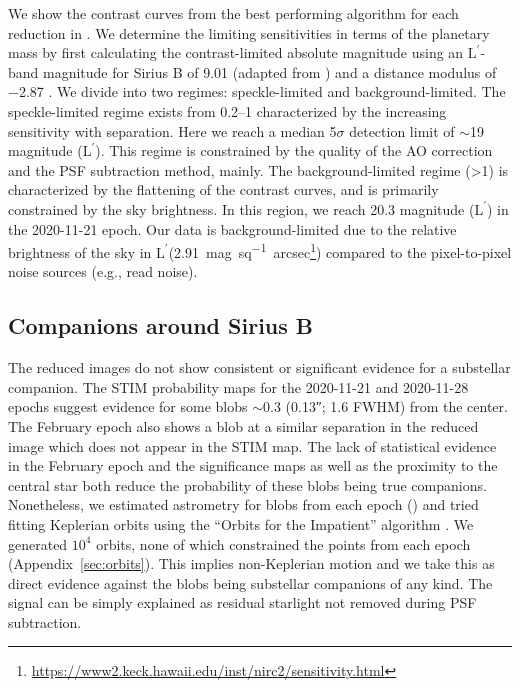\documentclass[twocolumn]{aastex631}
\newcommand\Lp{$\mathrm{L}^\prime$}
\begin{document}
We show the contrast curves from the best performing algorithm for each reduction in . We determine the limiting sensitivities in terms of the planetary mass by first calculating the contrast-limited absolute magnitude using an \Lp-band magnitude for Sirius B of 9.01 (adapted from \citealp{bonnet-bidaudADONISHighContrast2008a}) and a distance modulus of \num{-2.87} \citep{collaborationGaiaEarlyData2021a}. We divide  into two regimes: speckle-limited and background-limited. The speckle-limited regime exists from \qtyrange{0.2}{1}{\au} characterized by the increasing sensitivity with separation. Here we reach a median 5$\sigma$ detection limit of $\sim$19 magnitude (\Lp). This regime is constrained by the quality of the AO correction and the PSF subtraction method, mainly. The background-limited regime (\textgreater\qty{1}{\au}) is characterized by the flattening of the contrast curves, and is primarily constrained by the sky brightness. In this region, we reach 20.3 magnitude (\Lp) in the 2020-11-21 epoch. Our data is background-limited due to the relative brightness of the sky in \Lp (\qty{2.91}{mag\per sq. arcsec}\footnote{\url{https://www2.keck.hawaii.edu/inst/nirc2/sensitivity.html}}) compared to the pixel-to-pixel noise sources (e.g., read noise).

\subsection{Companions around Sirius B}

The reduced images do not show consistent or significant evidence for a substellar companion. The STIM probability maps for the 2020-11-21 and 2020-11-28 epochs suggest evidence for some blobs $\sim$\qty{0.3}{\au} (\ang{;;0.13}; 1.6 FWHM) from the center. The February epoch also shows a blob at a similar separation in the reduced image which does not appear in the STIM map. The lack of statistical evidence in the February epoch and the significance maps as well as the proximity to the central star both reduce the probability of these blobs being true companions. Nonetheless, we estimated astrometry for blobs from each epoch () and tried fitting Keplerian orbits using the ``Orbits for the Impatient'' algorithm \citep[OFTI;][]{bluntOrbitsImpatientBayesian2017a}. We generated $10^4$ orbits, none of which constrained the points from each epoch (Appendix~\ref{sec:orbits}). This implies non-Keplerian motion and we take this as direct evidence against the blobs being substellar companions of any kind. The signal can be simply explained as residual starlight not removed during PSF subtraction.
\end{document}
